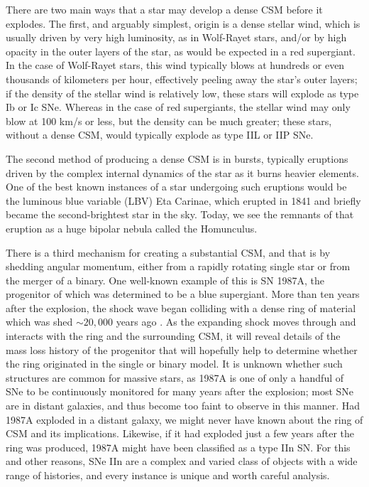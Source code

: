 \documentclass[iop]{emulateapj}
\begin{document}
There are two main ways that a star may develop a dense CSM before it explodes. The first, and arguably simplest, origin is a dense stellar wind, which is usually driven by very high luminosity, as in Wolf-Rayet stars, and/or by high opacity in the outer layers of the star, as would be expected in a red supergiant. In the case of Wolf-Rayet stars, this wind typically blows at hundreds or even thousands of kilometers per hour, effectively peeling away the star's outer layers; if the density of the stellar wind is relatively low, these stars will explode as type Ib or Ic SNe. Whereas in the case of red supergiants, the stellar wind may only blow at 100 km/s or less, but the density can be much greater; these stars, without a dense CSM, would typically explode as type IIL or IIP SNe.

The second method of producing a dense CSM is in bursts, typically eruptions driven by the complex internal dynamics of the star as it burns heavier elements. One of the best known instances of a star undergoing such eruptions would be the luminous blue variable (LBV) Eta Carinae, which erupted in 1841 and briefly became the second-brightest star in the sky. Today, we see the remnants of that eruption as a huge bipolar nebula called the Homunculus.

There is a third mechanism for creating a substantial CSM, and that is by shedding angular momentum, either from a rapidly rotating single star or from the merger of a binary. One well-known example of this is SN 1987A, the progenitor of which was determined to be a blue supergiant. More than ten years after the explosion, the shock wave began colliding with a dense ring of material which was shed $\sim20,000$ years ago \citep{Fra15}. As the expanding shock moves through and interacts with the ring and the surrounding CSM, it will reveal details of the mass loss history of the progenitor that will hopefully help to determine whether the ring originated in the single or binary model. It is unknown whether such structures are common for massive stars, as 1987A is one of only a handful of SNe to be continuously monitored for many years after the explosion; most SNe are in distant galaxies, and thus become too faint to observe in this manner. Had 1987A exploded in a distant galaxy, we might never have known about the ring of CSM and its implications. Likewise, if it had exploded just a few years after the ring was produced, 1987A might have been classified as a type IIn SN. For this and other reasons, SNe IIn are a complex and varied class of objects with a wide range of histories, and every instance is unique and worth careful analysis.
\end{document}
